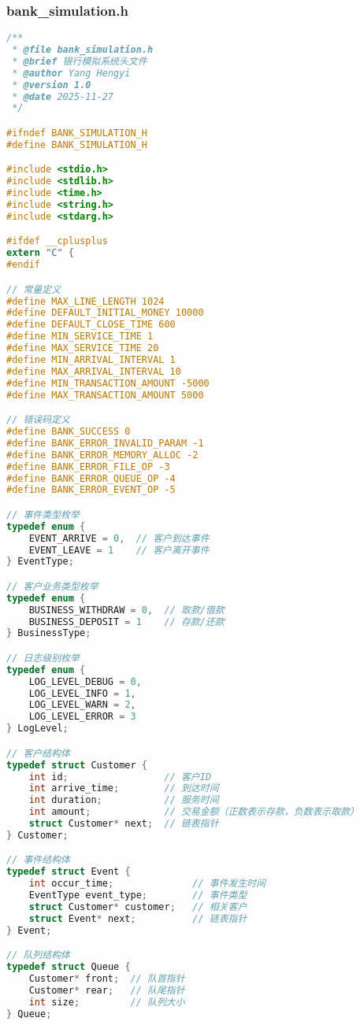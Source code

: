 \documentclass[12pt,a4paper]{article}
\begin{document}
\subsubsection{bank\_simulation.h}
\begin{lstlisting}[language=C,caption=bank\_simulation.h]
/**
 * @file bank_simulation.h
 * @brief 银行模拟系统头文件
 * @author Yang Hengyi
 * @version 1.0
 * @date 2025-11-27
 */

#ifndef BANK_SIMULATION_H
#define BANK_SIMULATION_H

#include <stdio.h>
#include <stdlib.h>
#include <time.h>
#include <string.h>
#include <stdarg.h>

#ifdef __cplusplus
extern "C" {
#endif

// 常量定义
#define MAX_LINE_LENGTH 1024
#define DEFAULT_INITIAL_MONEY 10000
#define DEFAULT_CLOSE_TIME 600
#define MIN_SERVICE_TIME 1
#define MAX_SERVICE_TIME 20
#define MIN_ARRIVAL_INTERVAL 1
#define MAX_ARRIVAL_INTERVAL 10
#define MIN_TRANSACTION_AMOUNT -5000
#define MAX_TRANSACTION_AMOUNT 5000

// 错误码定义
#define BANK_SUCCESS 0
#define BANK_ERROR_INVALID_PARAM -1
#define BANK_ERROR_MEMORY_ALLOC -2
#define BANK_ERROR_FILE_OP -3
#define BANK_ERROR_QUEUE_OP -4
#define BANK_ERROR_EVENT_OP -5

// 事件类型枚举
typedef enum {
    EVENT_ARRIVE = 0,  // 客户到达事件
    EVENT_LEAVE = 1    // 客户离开事件
} EventType;

// 客户业务类型枚举
typedef enum {
    BUSINESS_WITHDRAW = 0,  // 取款/借款
    BUSINESS_DEPOSIT = 1    // 存款/还款
} BusinessType;

// 日志级别枚举
typedef enum {
    LOG_LEVEL_DEBUG = 0,
    LOG_LEVEL_INFO = 1,
    LOG_LEVEL_WARN = 2,
    LOG_LEVEL_ERROR = 3
} LogLevel;

// 客户结构体
typedef struct Customer {
    int id;                 // 客户ID
    int arrive_time;        // 到达时间
    int duration;           // 服务时间
    int amount;             // 交易金额（正数表示存款，负数表示取款）
    struct Customer* next;  // 链表指针
} Customer;

// 事件结构体
typedef struct Event {
    int occur_time;              // 事件发生时间
    EventType event_type;        // 事件类型
    struct Customer* customer;   // 相关客户
    struct Event* next;          // 链表指针
} Event;

// 队列结构体
typedef struct Queue {
    Customer* front;  // 队首指针
    Customer* rear;   // 队尾指针
    int size;         // 队列大小
} Queue;


\end{lstlisting}
\end{document}
